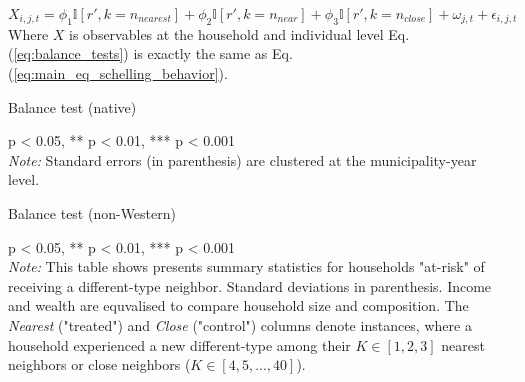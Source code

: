 \documentclass[main.tex]{subfiles}
\begin{document}
\begin{equation}
    X_{i, j, t} = \phi_1 \mathbb{I}[r', k=n_{nearest}] + \phi_2 \mathbb{I}[r', k = n_{near}] + \phi_3 \mathbb{I}[r', k = n_{close}] + \omega_{j, t} + \epsilon_{i, j, t} 
    \label{eq:balance_tests}
\end{equation}
Where $X$ is observables at the household and individual level Eq. (\ref{eq:balance_tests}) is exactly the same as Eq. (\ref{eq:main_eq_schelling_behavior}). 

\begin{table}[H]
    \centering
    \caption{Balance test (native)}
    \resizebox{\textwidth}{!}{}
    \label{tab:my_label}
    \begin{tablenotes}[flushleft]
\item \scriptsize * p < 0.05, ** p < 0.01, *** p < 0.001 \\ \textit{Note:} Standard errors (in parenthesis) are clustered at the municipality-year level. 
\end{tablenotes}
\end{table}

\begin{table}[H]
    \centering
    \caption{Balance test (non-Western)}
    \resizebox{\textwidth}{!}{}
    \label{tab:my_label}
    \begin{tablenotes}[flushleft]
\item \scriptsize * p < 0.05, ** p < 0.01, *** p < 0.001 \\ \textit{Note:} This table shows presents summary statistics for households "at-risk" of receiving a different-type neighbor. Standard deviations in parenthesis. Income and wealth are equvalised to compare household size and composition. The \textit{Nearest} ("treated") and \textit{Close} ("control") columns denote instances, where a household experienced a new different-type among their $K\in [1,2,3]$ nearest neighbors or close neighbors ($K\in [4, 5, ...,40]$).
\end{tablenotes}
\end{table}
\end{document}
